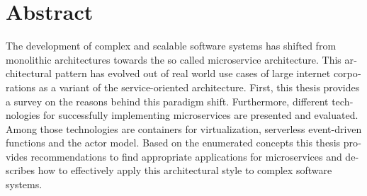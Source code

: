 \chapter{Abstract}

\begin{english} %

The development of complex and scalable software systems has shifted from monolithic architectures towards the so called microservice architecture. This architectural pattern has evolved out of real world use cases of large internet corporations as a variant of the service-oriented architecture. First, this thesis provides a survey on the reasons behind this paradigm shift. Furthermore, different technologies for successfully implementing microservices are presented and evaluated. Among those technologies are containers for virtualization, serverless event-driven functions and the actor model. Based on the enumerated concepts this thesis provides recommendations to find appropriate applications for microservices and describes how to effectively apply this architectural style to complex software systems.

\end{english}
